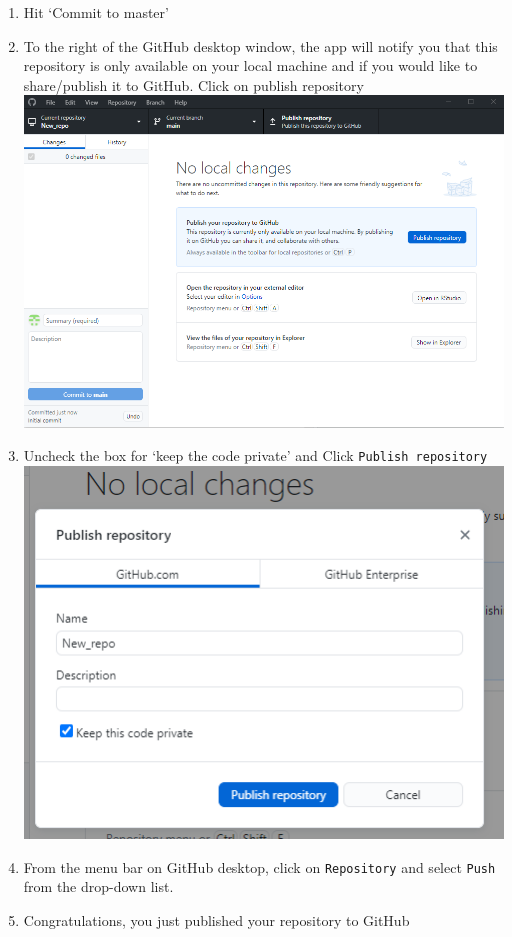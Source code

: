 \documentclass[
]{book}
\begin{document}
\begin{enumerate}
\item
  Hit `Commit to master'
\item
  To the right of the GitHub desktop window, the app will notify you that this repository is only available on your local machine and if you would like to share/publish it to GitHub. Click on publish repository\\
  \includegraphics{tutorial_screenshots/gh_desktop_publish_repo.png}\\
\item
  Uncheck the box for `keep the code private' and Click \texttt{Publish\ repository}\\
  \includegraphics{tutorial_screenshots/gh_desktop_uncheck_private.png}
\item
  From the menu bar on GitHub desktop, click on \texttt{Repository} and select \texttt{Push} from the drop-down list.
\item
  Congratulations, you just published your repository to GitHub
\end{enumerate}
\end{document}

